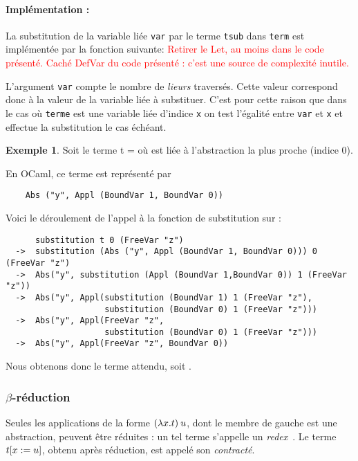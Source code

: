 \documentclass {article}
\newcommand{\codefrom}[3]
           {}
\theoremstyle{definition}
\newtheorem{example}{Exemple}
\theoremstyle{remark}
\newcommand{\todo}[1]{\textcolor{red}{#1}}
\newcommand{\fun}[1]{\lstinline!#1!}
\begin{document}
\paragraph{Implémentation :} 
La substitution de la variable liée \lstinline!var! par le terme
\lstinline!tsub! dans \lstinline!term! est implémentée par la fonction suivante:
\todo{Retirer le Let, au moins dans le code présenté. Caché DefVar du code présenté : c'est une source de complexité inutile.}
%
\codefrom{untyped}{lambda}{substitution}

L'argument \fun{var} compte le nombre de \emph{lieurs} traversés.
Cette valeur correspond donc à la valeur de la variable liée à substituer. C'est pour cette
raison que dans le cas où \fun{terme} est une variable liée d'indice \fun{x} on test l'égalité entre 
\fun{var} et \fun{x} et effectue la substitution le cas échéant.


\begin{example}
  Soit le terme t =  où  est liée à
  l'abstraction la plus proche (indice 0).

  En OCaml, ce terme est représenté par 
  \begin{lstlisting}
    Abs ("y", Appl (BoundVar 1, BoundVar 0))
  \end{lstlisting}

  Voici le déroulement de l'appel à la fonction de substitution sur  :
  \begin{lstlisting}
      substitution t 0 (FreeVar "z")
  ->  substitution (Abs ("y", Appl (BoundVar 1, BoundVar 0))) 0 (FreeVar "z")
  ->  Abs("y", substitution (Appl (BoundVar 1,BoundVar 0)) 1 (FreeVar "z"))
  ->  Abs("y", Appl(substitution (BoundVar 1) 1 (FreeVar "z"), 
                    substitution (BoundVar 0) 1 (FreeVar "z")))
  ->  Abs("y", Appl(FreeVar "z", 
                    substitution (BoundVar 0) 1 (FreeVar "z")))
  ->  Abs("y", Appl(FreeVar "z", BoundVar 0))
  \end{lstlisting}

  Nous obtenons donc le terme attendu, soit .
\end{example}

\subsubsection{$\beta$-réduction}
\label{reduction}


Seules les applications de la forme \((\lambda x. t)\:u\),
dont le membre de gauche est une abstraction, peuvent être réduites :
un tel terme s'appelle un
\emph{redex}~\citep{krivine:lambda-calculus}. Le terme
\(t[x := u]\), obtenu après réduction, est appelé son
\emph{contracté}.
\end{document}

